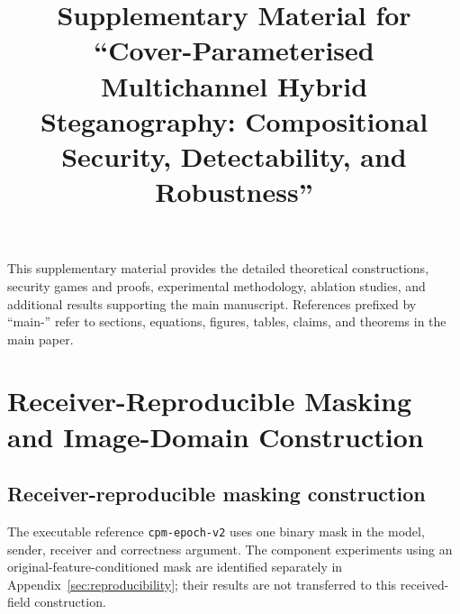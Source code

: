 \documentclass[journal]{IEEEtran}
\theoremstyle{definition}
\theoremstyle{game}
\begin{document}
%
\title{Supplementary Material for\\
``Cover-Parameterised Multichannel Hybrid Steganography: Compositional Security, Detectability, and Robustness''}
%
%
% 
%








%





\author{}
\maketitle

\noindent
This supplementary material provides the detailed theoretical constructions, security games and proofs, experimental methodology, ablation studies, and additional results supporting the main manuscript. References prefixed by ``main-'' refer to sections, equations, figures, tables, claims, and theorems in the main paper.








\IEEEpeerreviewmaketitle




\appendices




\section{Receiver-Reproducible Masking and Image-Domain Construction}
\label{sec:qim-construction}
\subsection{Receiver-reproducible masking construction}\label{subsec:qim-mask-theory}
The executable reference \texttt{cpm-epoch-v2} uses one binary mask in the
model, sender, receiver and correctness argument. The component experiments
using an original-feature-conditioned mask are identified separately in
Appendix~\ref{sec:reproducibility}; their results are not transferred to
this received-field construction.
\end{document}
